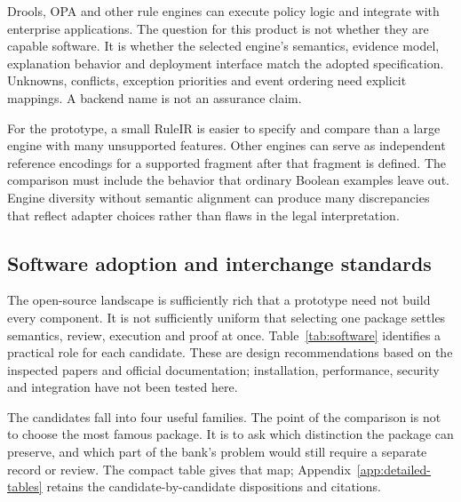
Drools, OPA and other rule engines can execute policy logic and integrate with
enterprise applications. The question for this product is not whether they
are capable software. It is whether the selected engine's semantics, evidence
model, explanation behavior and deployment interface match the adopted
specification. Unknowns, conflicts, exception priorities and event ordering
need explicit mappings. A backend name is not an assurance claim.

For the prototype, a small RuleIR is easier to specify and compare than a
large engine with many unsupported features. Other engines can serve as
independent reference encodings for a supported fragment after that fragment
is defined. The comparison must include the behavior that ordinary Boolean
examples leave out. Engine diversity without semantic alignment can produce
many discrepancies that reflect adapter choices rather than flaws in the
legal interpretation.

\subsection{Software adoption and interchange standards}
\label{merge:P-02-literature:08}


The open-source landscape is sufficiently rich that a prototype need not build
every component. It is not sufficiently uniform that selecting one package
settles semantics, review, execution and proof at once. Table~\ref{tab:software}
identifies a practical role for each candidate. These are design recommendations
based on the inspected papers and official documentation; installation,
performance, security and integration have not been tested here.

The candidates fall into four useful families. The point of the comparison is
not to choose the most famous package. It is to ask which distinction the package
can preserve, and which part of the bank's problem would still require a separate
record or review. The compact table gives that map; Appendix~\ref{app:detailed-tables}
retains the candidate-by-candidate dispositions and citations.

